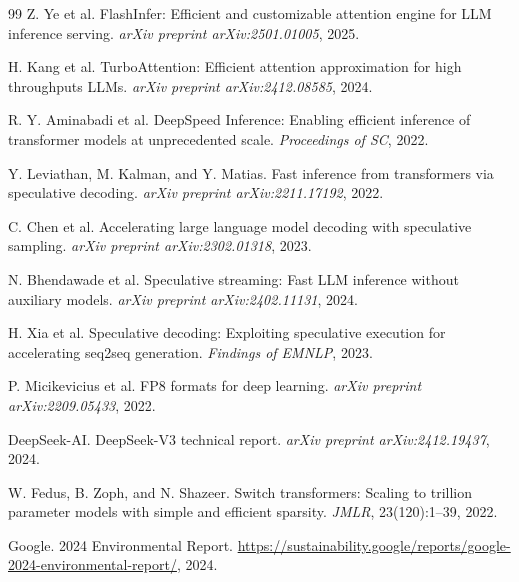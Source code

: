 \documentclass[11pt]{article}
\begin{document}
\begin{thebibliography}{99}
 Z. Ye et al. FlashInfer: Efficient and customizable attention engine for LLM inference serving. \textit{arXiv preprint arXiv:2501.01005}, 2025.

 H. Kang et al. TurboAttention: Efficient attention approximation for high throughputs LLMs. \textit{arXiv preprint arXiv:2412.08585}, 2024.


 R. Y. Aminabadi et al. DeepSpeed Inference: Enabling efficient inference of transformer models at unprecedented scale. \textit{Proceedings of SC}, 2022.


 Y. Leviathan, M. Kalman, and Y. Matias. Fast inference from transformers via speculative decoding. \textit{arXiv preprint arXiv:2211.17192}, 2022.

 C. Chen et al. Accelerating large language model decoding with speculative sampling. \textit{arXiv preprint arXiv:2302.01318}, 2023.

 N. Bhendawade et al. Speculative streaming: Fast LLM inference without auxiliary models. \textit{arXiv preprint arXiv:2402.11131}, 2024.

 H. Xia et al. Speculative decoding: Exploiting speculative execution for accelerating seq2seq generation. \textit{Findings of EMNLP}, 2023.


 P. Micikevicius et al. FP8 formats for deep learning. \textit{arXiv preprint arXiv:2209.05433}, 2022.


 DeepSeek-AI. DeepSeek-V3 technical report. \textit{arXiv preprint arXiv:2412.19437}, 2024.

 W. Fedus, B. Zoph, and N. Shazeer. Switch transformers: Scaling to trillion parameter models with simple and efficient sparsity. \textit{JMLR}, 23(120):1--39, 2022.


 Google. 2024 Environmental Report. \url{https://sustainability.google/reports/google-2024-environmental-report/}, 2024.


\end{thebibliography}
\end{document}
